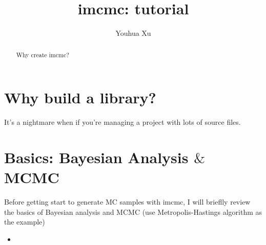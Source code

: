 \documentclass[a4paper,11pt]{article}
\newcommand{\insertcode}[2]{\begin{itemize}\item[]\end{itemize}}
\begin{document}
    
\title{imcmc: tutorial}

\author[1,2]{Youhua Xu}

\maketitle

\begin{abstract}
Why create imcmc?
\end{abstract}

\maketitle

\section{Why build a library?}
It's a nightmare when if you're managing a project with lots of source files.

\section{Basics: Bayesian Analysis $\&$ MCMC}
Before getting start to generate MC samples with imcmc, I will brieflly
review the basics of Bayesian analysis and MCMC (use Metropolis-Hastings
algorithm as the example)


%
%
%
%
%
%
%
%


\insertcode{"../examples/gaussian.cpp"}{Example of multi-dimensional Gaussian likelihood distribution.} %

\end{document}
